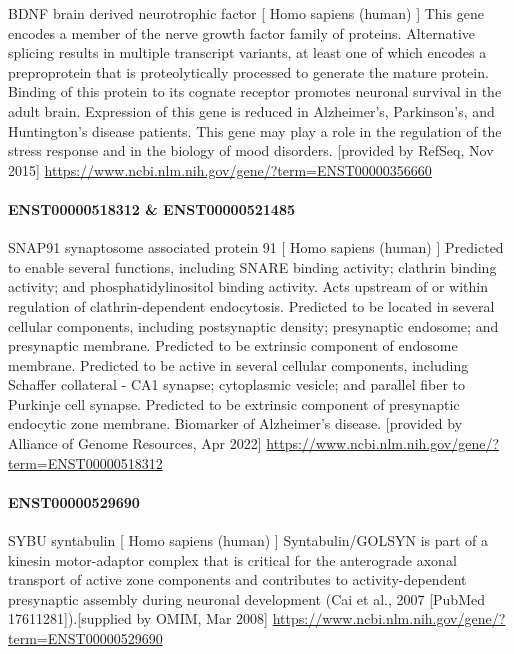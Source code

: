 \documentclass[
]{article}
\begin{document}
BDNF brain derived neurotrophic factor {[} Homo sapiens (human) {]} This
gene encodes a member of the nerve growth factor family of proteins.
Alternative splicing results in multiple transcript variants, at least
one of which encodes a preproprotein that is proteolytically processed
to generate the mature protein. Binding of this protein to its cognate
receptor promotes neuronal survival in the adult brain. Expression of
this gene is reduced in Alzheimer's, Parkinson's, and Huntington's
disease patients. This gene may play a role in the regulation of the
stress response and in the biology of mood disorders. {[}provided by
RefSeq, Nov 2015{]}
\url{https://www.ncbi.nlm.nih.gov/gene/?term=ENST00000356660}

\hypertarget{enst00000518312-enst00000521485}{%
\paragraph{ENST00000518312 \&
ENST00000521485}\label{enst00000518312-enst00000521485}}

SNAP91 synaptosome associated protein 91 {[} Homo sapiens (human) {]}
Predicted to enable several functions, including SNARE binding activity;
clathrin binding activity; and phosphatidylinositol binding activity.
Acts upstream of or within regulation of clathrin-dependent endocytosis.
Predicted to be located in several cellular components, including
postsynaptic density; presynaptic endosome; and presynaptic membrane.
Predicted to be extrinsic component of endosome membrane. Predicted to
be active in several cellular components, including Schaffer collateral
- CA1 synapse; cytoplasmic vesicle; and parallel fiber to Purkinje cell
synapse. Predicted to be extrinsic component of presynaptic endocytic
zone membrane. Biomarker of Alzheimer's disease. {[}provided by Alliance
of Genome Resources, Apr 2022{]}
\url{https://www.ncbi.nlm.nih.gov/gene/?term=ENST00000518312}

\hypertarget{enst00000529690}{%
\paragraph{ENST00000529690}\label{enst00000529690}}

SYBU syntabulin {[} Homo sapiens (human) {]} Syntabulin/GOLSYN is part
of a kinesin motor-adaptor complex that is critical for the anterograde
axonal transport of active zone components and contributes to
activity-dependent presynaptic assembly during neuronal development (Cai
et al., 2007 {[}PubMed 17611281{]}).{[}supplied by OMIM, Mar 2008{]}
\url{https://www.ncbi.nlm.nih.gov/gene/?term=ENST00000529690}
\end{document}
